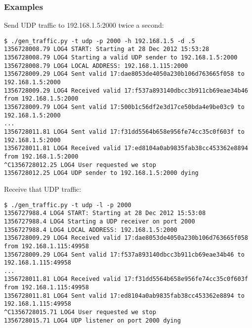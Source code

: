 \subsubsection{Examples}
\par Send \ac{UDP} traffic to 192.168.1.5:2000 twice a second:
\begin{lstlisting}
$ ./gen_traffic.py -t udp -p 2000 -h 192.168.1.5 -d .5
1356728008.79 LOG4 START: Starting at 28 Dec 2012 15:53:28
1356728008.79 LOG4 Starting a valid UDP sender to 192.168.1.5:2000
1356728008.79 LOG4 LOCAL ADDRESS: 192.168.1.115:2000
1356728009.29 LOG4 Sent valid 17:dae8053de4050a230b106d763665f058 to 192.168.1.5:2000
1356728009.29 LOG4 Received valid 17:f537a893140dbcc3b911cb69eae34b46 from 192.168.1.5:2000
1356728009.79 LOG4 Sent valid 17:500b1c56df2e3d17ce50bda4e9be03c9 to 192.168.1.5:2000
...
1356728011.81 LOG4 Sent valid 17:f31dd5564b658e956fe74cc35c0f603f to 192.168.1.5:2000
1356728011.81 LOG4 Received valid 17:ed8104a0ab9835fab38cc453362e8894 from 192.168.1.5:2000
^C1356728012.25 LOG4 User requested we stop
1356728012.25 LOG4 UDP sender to 192.168.1.5:2000 dying
\end{lstlisting}

\par Receive that \ac{UDP} traffic:
\begin{lstlisting}
$ ./gen_traffic.py -t udp -l -p 2000
1356727988.4 LOG4 START: Starting at 28 Dec 2012 15:53:08
1356727988.4 LOG4 Starting a UDP receiver on port 2000
1356727988.4 LOG4 LOCAL ADDRESS: 192.168.1.5:2000
1356728009.29 LOG4 Received valid 17:dae8053de4050a230b106d763665f058 from 192.168.1.115:49958
1356728009.29 LOG4 Sent valid 17:f537a893140dbcc3b911cb69eae34b46 to 192.168.1.115:49958
...
1356728011.81 LOG4 Received valid 17:f31dd5564b658e956fe74cc35c0f603f from 192.168.1.115:49958
1356728011.81 LOG4 Sent valid 17:ed8104a0ab9835fab38cc453362e8894 to 192.168.1.115:49958
^C1356728015.71 LOG4 User requested we stop
1356728015.71 LOG4 UDP listener on port 2000 dying
\end{lstlisting}

